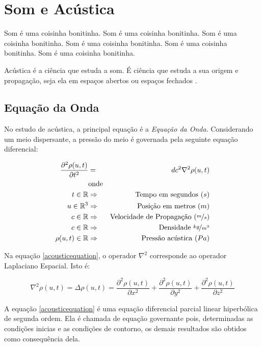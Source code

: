 \section{Som e Acústica}

Som é uma coisinha bonitinha.
Som é uma coisinha bonitinha.
Som é uma coisinha bonitinha.
Som é uma coisinha bonitinha.
Som é uma coisinha bonitinha.
Som é uma coisinha bonitinha.

Acústica é a ciência que estuda a som. É ciência que estuda a sua origem e propagação, seja ela em espaços abertos ou espaços fechados \cite{kuttruff2007acoustics}.

\subsection{Equação da Onda}

No estudo de acústica, a principal equação é a \emph{Equação da Onda}. Considerando um meio dispersante, a pressão do meio é governada pela seguinte equação diferencial:

\begin{eqnarray}
\frac{\partial^2 \rho(u, t)}{\partial t^2} &=& dc^2 \nabla^2 \rho(u, t)\label{acousticequation} \\
&\text{onde}&\nonumber\\
t \in \mathbb{R} &\Rightarrow& \text{Tempo em segundos }(s) \nonumber\\
u \in \mathbb{R}^3 &\Rightarrow& \text{Posição em metros }(m) \nonumber\\
c \in \mathbb{R} &\Rightarrow& \text{Velocidade de Propagação }(\nicefrac{m}{s}) \nonumber\\
c \in \mathbb{R} &\Rightarrow& \text{Densidade } \nicefrac{kg}{m^3} \nonumber\\
\rho(u, t) \in \mathbb{R} &\Rightarrow& \text{Pressão acústica }(Pa) \nonumber
\end{eqnarray}

Na equação \eqref{acousticequation}, o operador $\nabla^2$ corresponde ao operador Laplaciano Espacial. Isto é:

\begin{equation}
	\nabla^2 \rho(u, t) = \Delta \rho(u, t) = \frac{\partial^2 \rho(u, t)}{\partial x^2} + \frac{\partial^2 \rho(u, t)}{\partial y^2} + \frac{\partial^2 \rho(u, t)}{\partial z^2}
\end{equation}

A equação \eqref{acousticequation} é uma equação diferencial parcial linear hiperbólica de segunda ordem. Ela é chamada de equação governante pois, determinadas as condições inicias e as condições de contorno, os demais resultados são obtidos como consequência dela.


